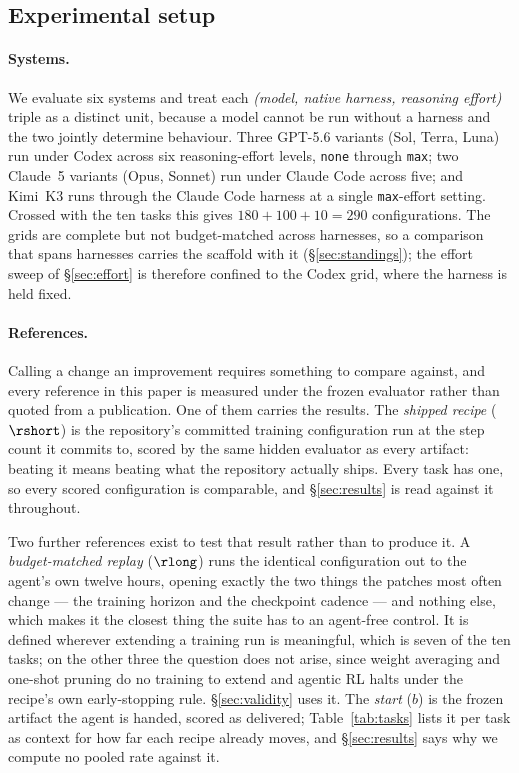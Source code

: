 

\subsection{Experimental setup}
\label{sec:setup}

\paragraph{Systems.} We evaluate six systems and treat each \emph{(model, native harness, reasoning
effort)} triple as a distinct unit, because a model cannot be run without a harness and the two
jointly determine behaviour. Three GPT-5.6 variants (Sol, Terra, Luna) run under Codex across six
reasoning-effort levels, \texttt{none} through \texttt{max}; two Claude~5 variants (Opus, Sonnet)
run under Claude Code across five; and Kimi~K3 runs through the Claude Code harness at a single
\texttt{max}-effort setting. Crossed with the ten tasks this gives $180+100+10=290$ configurations.
The grids are complete but not budget-matched across harnesses, so a comparison that spans harnesses
carries the scaffold with it (\S\ref{sec:standings}); the effort sweep of \S\ref{sec:effort} is
therefore confined to the Codex grid, where the harness is held fixed.

\paragraph{References.} Calling a change an improvement requires something to compare against, and
every reference in this paper is measured under the frozen evaluator rather than quoted from a
publication. One of them carries the results. The \emph{shipped recipe} ($\rshort$) is the
repository's committed training configuration run at the step count it commits to, scored by the same
hidden evaluator as every artifact: beating it means beating what the repository actually ships. Every
task has one, so every scored configuration is comparable, and \S\ref{sec:results} is read against it
throughout.

Two further references exist to test that result rather than to produce it. A \emph{budget-matched
replay} ($\rlong$) runs the identical configuration out to the agent's own twelve hours, opening
exactly the two things the patches most often change --- the training horizon and the checkpoint
cadence --- and nothing else, which makes it the closest thing the suite has to an agent-free control.
It is defined wherever extending a training run is meaningful, which is seven of the ten tasks; on the
other three the question does not arise, since weight averaging and one-shot pruning do no training to
extend and agentic RL halts under the recipe's own early-stopping rule. \S\ref{sec:validity} uses it.
The \emph{start} ($b$) is the frozen artifact the agent is handed, scored as delivered;
Table~\ref{tab:tasks} lists it per task as context for how far each recipe already moves, and
\S\ref{sec:results} says why we compute no pooled rate against it.


